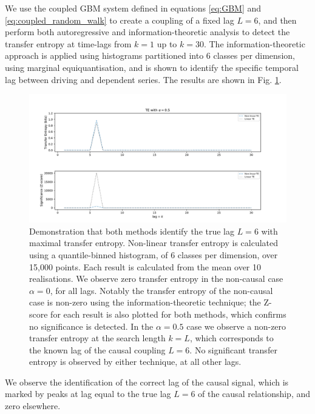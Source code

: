 \documentclass[]{rsos}%
\begin{document}
  We use the coupled GBM system defined in equations \ref{eq:GBM} and \ref{eq:coupled_random_walk} to create a coupling of a fixed lag $L=6$, and then perform both autoregressive and information-theoretic analysis to detect the transfer entropy at time-lags from $k=1$ up to $k=30$. The information-theoretic approach is applied using histograms partitioned into 6 classes per dimension, using marginal equiquantisation, and is shown to identify the specific temporal lag between driving and dependent series. The results are shown in Fig. \ref{fig:dropoff}.

  \begin{figure}[!htb]
    \includegraphics[width=\linewidth]{images/dropoff3.pdf}
    \caption{ Demonstration that both methods identify the true lag $L=6$  with maximal transfer entropy. Non-linear transfer entropy is calculated using a quantile-binned histogram, of 6 classes per dimension, over 15,000 points. Each result is calculated from the mean over 10 realisations. We observe zero transfer entropy in the non-causal case $\alpha = 0$, for all lags. Notably the transfer entropy of the non-causal case is non-zero using the information-theoretic technique; the Z-score for each result is also plotted for both methods, which confirms no significance is detected. In the $\alpha = 0.5$ case we observe a non-zero transfer entropy at the search length $k = L$, which corresponds to the known lag of the causal coupling $L=6$. No significant transfer entropy is observed by either technique, at all other lags. 
    }
    \label{fig:dropoff}
    
  \end{figure}
  
  We observe the identification of the correct lag of the causal signal, which is marked by peaks at lag equal to the true lag $L=6$ of the causal relationship, and zero elsewhere. %
  
\end{document}
